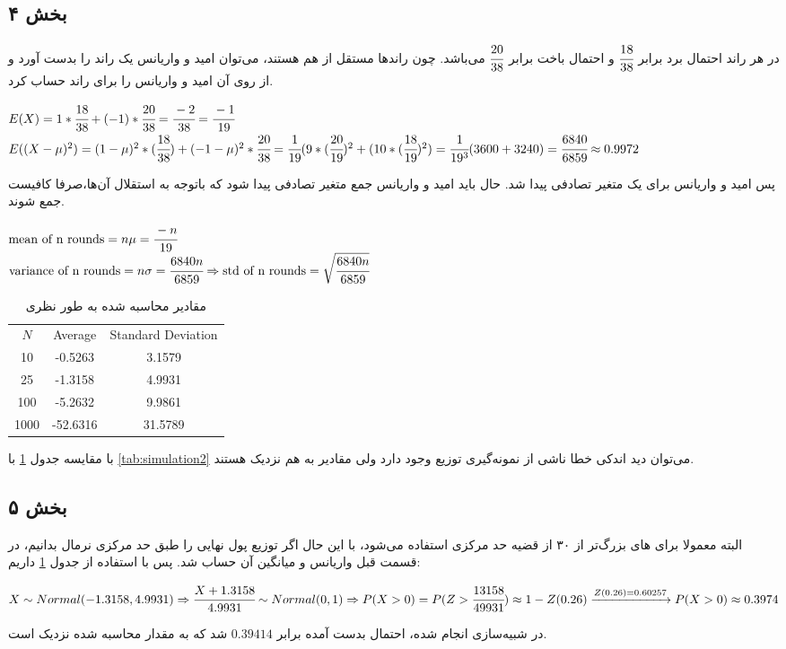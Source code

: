 \documentclass[12pt]{article}
\begin{document}
\subsection{بخش ۴}
در هر راند احتمال برد برابر 
$\cfrac{18}{38}$
و احتمال باخت برابر 
$\cfrac{20}{38}$
می‌باشد. چون راندها مستقل از هم هستند، می‌توان امید و واریانس یک راند را بدست آورد و از روی آن امید و واریانس را برای 
راند حساب کرد.
\begin{latin}
	$
	E(X) = 1 * \cfrac{18}{38} + (-1) * \cfrac{20}{38} = \cfrac{-2}{38} = \cfrac{-1}{19}
	$
	\\
	$
	E((X - \mu)^2) = (1 - \mu)^2 * (\cfrac{18}{38}) + (-1 - \mu)^2 * \cfrac{20}{38}= \cfrac{1}{19} (9 * (\cfrac{20}{19})^2 +(10 * (\cfrac{18}{19})^2  )
	= \cfrac{1}{19^3} (3600 + 3240) = \cfrac{6840}{6859} \approx 0.9972
	$
\end{latin}
پس امید و واریانس برای یک متغیر تصادفی پیدا شد. حال باید امید و واریانس جمع  متغیر تصادفی پیدا شود که باتوجه به استقلال آن‌ها،‌صرفا کافیست جمع شوند.
\begin{latin}
	$
	\text{mean of n rounds} = n\mu = \cfrac{-n}{19}
	$
	\\
	$
	\text{variance of n rounds} = n\sigma = \cfrac{6840n}{6859} \Rightarrow \text{std of n rounds} = \sqrt{\cfrac{6840n}{6859}}
	$
\end{latin}
\begin{table}[ht]
	\centering
	\caption{مقادیر محاسبه شده به طور نظری}
	\label{tab:q_4_calc}
	\begin{latin}


	\begin{tabular}{c c c}
		$N$ & {Average} & {Standard Deviation} \\
		10   & -0.5263 & 3.1579 \\
		25   & -1.3158 & 4.9931 \\
		100  & -5.2632 & 9.9861 \\
		1000 & -52.6316 & 31.5789 \\
	\end{tabular}
		\end{latin}
\end{table}
با مقایسه جدول \ref{tab:q_4_calc} با \ref{tab:simulation2} می‌توان دید اندکی خطا ناشی از نمونه‌گیری توزیع وجود دارد ولی مقادیر به هم نزدیک هستند.
\subsection{بخش ۵}
البته معمولا برای 
های بزرگ‌تر از ۳۰ از قضیه حد مرکزی استفاده می‌شود، با این حال اگر توزیع پول نهایی را طبق حد مرکزی نرمال بدانیم، در قسمت قبل واریانس و میانگین آن حساب شد. پس با استفاده از جدول \ref{tab:q_4_calc} داریم:
\begin{latin}
	$
	X \sim Normal(-1.3158, 4.9931) \Rightarrow \cfrac{X + 1.3158}{4.9931} \sim Normal(0, 1)  \Rightarrow P(X > 0) = P(Z > \cfrac{13158}{49931})  \approx 1 - Z(0.26) \xrightarrow{Z(0.26) = 0.60257} P(X > 0) \approx 0.3974
	$
\end{latin}
در شبیه‌سازی انجام شده، احتمال بدست آمده برابر 
$
0.39414
$
شد که به مقدار محاسبه شده نزدیک است.
\end{document}
